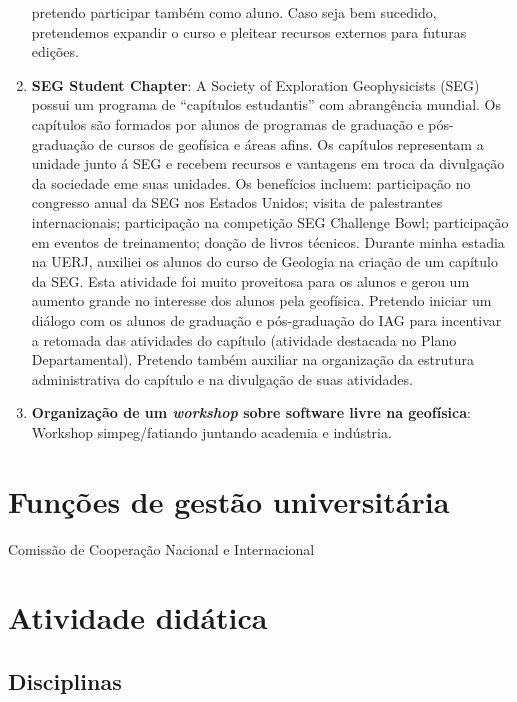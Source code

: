 \documentclass[11pt,a4paper,oneside]{book}
\begin{document}
\begin{enumerate}
    pretendo participar também como aluno. Caso seja bem sucedido, pretendemos
    expandir o curso e pleitear recursos externos para futuras edições.
  \item \textbf{SEG Student Chapter}: A Society of Exploration Geophysicists
    (SEG) possui um programa de ``capítulos estudantis'' com abrangência
    mundial. Os capítulos são formados por alunos de programas de graduação e
    pós-graduação de cursos de geofísica e áreas afins. Os capítulos
    representam a unidade junto á SEG e recebem recursos e vantagens em troca
    da divulgação da sociedade eme suas unidades. Os benefícios incluem:
    participação no congresso anual da SEG nos Estados Unidos; visita de
    palestrantes internacionais; participação na competição SEG Challenge Bowl;
    participação em eventos de treinamento; doação de livros técnicos. Durante
    minha estadia na UERJ, auxiliei os alunos do curso de Geologia na criação
    de um capítulo da SEG. Esta atividade foi muito proveitosa para os alunos
    e gerou um aumento grande no interesse dos alunos pela geofísica. Pretendo
    iniciar um diálogo com os alunos de graduação e pós-graduação do IAG para
    incentivar a retomada das atividades do capítulo (atividade destacada no
    Plano Departamental). Pretendo também auxiliar na organização da estrutura
    administrativa do capítulo e na divulgação de suas atividades.
  \item \textbf{Organização de um \emph{workshop} sobre software livre na
    geofísica}:
    Workshop simpeg/fatiando juntando academia e indústria.
\end{enumerate}


\chapter{Funções de gestão universitária}

Comissão de Cooperação Nacional e Internacional


\chapter{Atividade didática}


\section{Disciplinas}
\end{document}
